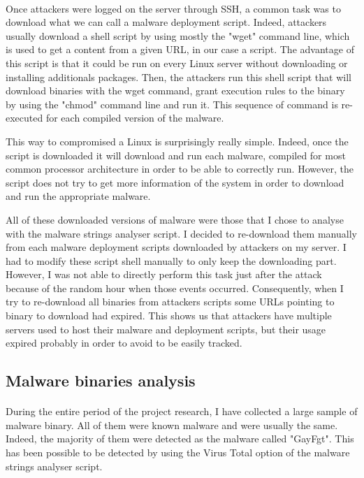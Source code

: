\paragraph{} %

Once attackers were logged on the server through SSH, a common task was to download what we
can call a malware deployment script. Indeed, attackers usually download a shell script by
using mostly the "wget" command line, which is used to get a content from a given URL, in our
case a script. The advantage of this script is that it could be run on every Linux server 
without downloading or installing additionals packages.
Then, the attackers run this shell script that will download binaries with the wget command,
grant execution rules to the binary by using the "chmod" command line and run it. This sequence
of command is re-executed for each compiled version of the malware.

This way to compromised a Linux is surprisingly really simple. Indeed, once the script is 
downloaded it will download and run each malware, compiled for most common processor architecture
in order to be able to correctly run. However, the script does not try to get more information
of the system in order to download and run the appropriate malware.

All of these downloaded versions of malware were those that I chose to analyse with the 
malware strings analyser script. I decided to re-download them manually from each 
malware deployment scripts downloaded by attackers on my server. I had to modify these
script shell manually to only keep the downloading part. However, I was not able to 
directly perform this task just after the attack because of the random hour when those events
occurred. Consequently, when I try to re-download all binaries from attackers scripts some URLs
pointing to binary to download had expired.
This shows us that attackers have multiple servers used to host their malware and deployment
scripts, but their usage expired probably in order to avoid to be easily tracked.

\subsection{Malware binaries analysis}

\paragraph{} %

During the entire period of the project research, I have collected a large sample of malware
binary. All of them were known malware and were usually the same. Indeed, the majority of them
were detected as the malware called "GayFgt". This has been possible to be detected by using
the Virus Total option of the malware strings analyser script.

